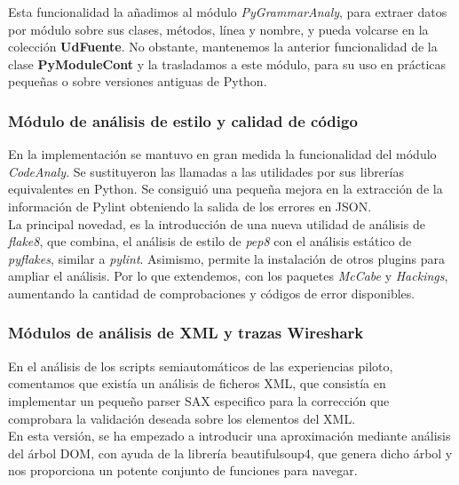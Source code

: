 Esta funcionalidad la añadimos al módulo \textit{PyGrammarAnaly}, para extraer datos por módulo sobre sus clases, métodos, línea y nombre, y pueda volcarse en la colección \textbf{UdFuente}. No obstante, mantenemos la anterior funcionalidad de la clase \textbf{PyModuleCont} y la trasladamos a este módulo, para su uso en prácticas pequeñas o sobre versiones antiguas de Python.\\


\subsubsection{Módulo de análisis de estilo y calidad de código} 
\label{subsec:mod_anal_codigo}

En la implementación se mantuvo en gran medida la funcionalidad del módulo \textit{CodeAnaly}. Se sustituyeron las llamadas a las utilidades por sus librerías equivalentes en Python. Se consiguió una pequeña mejora en la extracción de la información de Pylint obteniendo la salida de los errores en JSON.\\


La principal novedad, es la introducción de una nueva utilidad de análisis de \textit{flake8}, que combina, el análisis de estilo de \textit{pep8} con el análisis estático de \textit{pyflakes}, similar a \textit{pylint}. Asimismo, permite la instalación de otros plugins para ampliar el análisis. Por lo que extendemos, con los paquetes \textit{McCabe} y \textit{Hackings}, aumentando la cantidad de comprobaciones y códigos de error disponibles.\\


\subsubsection{Módulos de análisis de XML y trazas Wireshark}
\label{subsec:mod_anal_xml_wireshark}

En el análisis de los scripts semiautomáticos de las experiencias piloto, comentamos que existía un análisis de ficheros XML, que consistía en implementar un pequeño parser SAX especifico para la corrección que comprobara la validación deseada sobre los elementos del XML.\\


En esta versión,  se ha empezado a introducir una aproximación mediante análisis del árbol DOM, con ayuda de la librería beautifulsoup4, que genera dicho árbol y nos proporciona un potente conjunto de funciones para navegar.\\


